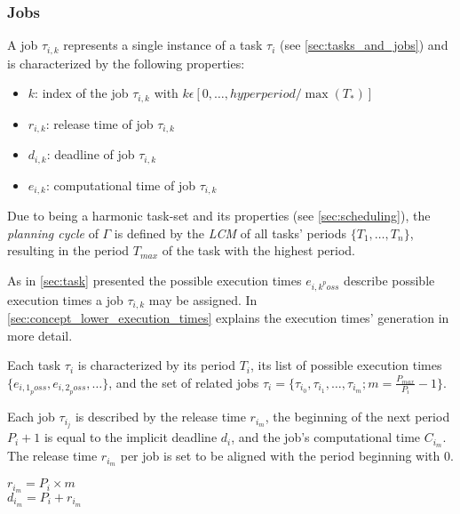 \subsubsection{Jobs}\label{sec:job}
A job $\tau_{i,k}$ represents a single instance of a task $\tau_i$ (see \cref{sec:tasks_and_jobs}) and is characterized by the following properties:
\begin{itemize}
  \item $k$: index of the job $\tau_{i,k}$ with $k \epsilon [0, \ldots, hyperperiod / \max(T_*)]$
  \item $r_{i,k}$: release time of job $\tau_{i,k}$
  \item $d_{i,k}$: deadline of job $\tau_{i,k}$
  \item $e_{i,k}$: computational time of job $\tau_{i,k}$
\end{itemize}

Due to being a harmonic task-set and its properties (see \cref{sec:scheduling}), the \textit{planning cycle}\cite{dar-tzenpengAssignmentSchedulingCommunicating1997} of $\Gamma$ is defined by the \textit{\ac{LCM}} of all tasks' periods $\{T_1, \ldots, T_n\}$, resulting in the period $T_{max}$ of the task with the highest period. 

As in \cref{sec:task} presented the possible execution times $e_{{i,k}^poss}$ describe possible execution times a job $\tau_{i,k}$ may be assigned.
In \cref{sec:concept_lower_execution_times} explains the execution times' generation in more detail.

Each task $\tau_i$ is characterized by its period $T_i$, its list of possible execution times $\{e_{{i,1}_poss}, e_{{i,2}_poss}, \ldots\}$, and the set of related jobs $\tau_i=\{\tau_{i_0}, \tau_{i_1}, \dots, \tau_{i_m}; m = \frac{P_{max}}{P_i} - 1\}$.

Each job $\tau_{i_j}$ is described by the release time $r_{i_m}$, the beginning of the next period $P_i+1$ is equal to the implicit deadline $d_i$, and the job's computational time $C_{i_m}$. The release time $r_{i_m}$ per job is set to be aligned with the period beginning with $0$.
\begin{center}
  $r_{i_m} = P_i \times m$ \\
  $d_{i_m} = P_i + r_{i_m}$
\end{center}

